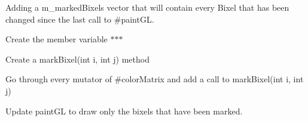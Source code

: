 
\begin{DoxyRefList}
\item[\label{task__task000001}%
\hypertarget{task__task000001}{}%
Class \hyperlink{classGLWidget}{G\-L\-Widget} ]Adding a m\-\_\-marked\-Bixels vector that will contain every Bixel that has been changed since the last call to \#paint\-G\-L.
\begin{DoxyItemize}
\item Create the member variable $\ast$$\ast$$\ast$
\item Create a mark\-Bixel(int i, int j) method
\item Go through every mutator of \#color\-Matrix and add a call to mark\-Bixel(int i, int j)
\item Update paint\-G\-L to draw only the bixels that have been marked. 
\end{DoxyItemize}
\end{DoxyRefList}